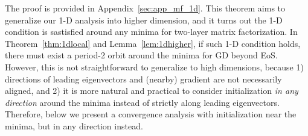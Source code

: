 \documentclass{article}
\theoremstyle{plain}
\theoremstyle{remark}
\newcommand{\norm}[1]{\left\lVert#1\right\rVert}
\begin{document}
The proof is provided in Appendix~\ref{sec:app_mf_1d}. This theorem aims to generalize our 1-D analysis into higher dimension, and it turns out the 1-D condition is sastisfied around any minima for two-layer matrix factorization.
In Theorem~\ref{thm:1dlocal} and Lemma~\ref{lem:1dhigher}, if such 1-D condition holds, there must exist a period-2 orbit around the minima for GD beyond EoS. However, this is not straightforward to generalize to high dimensions, because 1) directions of leading eigenvectors and (nearby) gradient are not necessarily aligned, and 2) it is more natural and practical to consider initialization \textit{in any direction} around the minima instead of strictly along leading eigenvectors. Therefore, below we present a convergence analysis with initialization near the minima, but in any direction instead.


\end{document}
